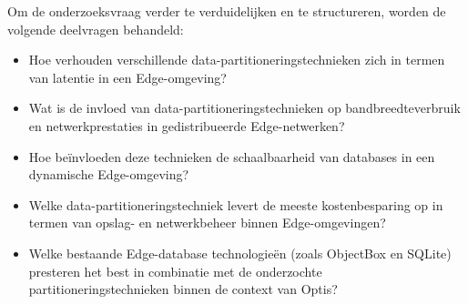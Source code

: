 Om de onderzoeksvraag verder te verduidelijken en te structureren, worden de volgende deelvragen behandeld:
\begin{itemize}
    \item Hoe verhouden verschillende data-partitioneringstechnieken zich in termen van latentie in een Edge-omgeving?
    \item Wat is de invloed van data-partitioneringstechnieken op bandbreedteverbruik en netwerkprestaties in gedistribueerde Edge-netwerken?
    \item Hoe beïnvloeden deze technieken de schaalbaarheid van databases in een dynamische Edge-omgeving?
    \item Welke data-partitioneringstechniek levert de meeste kostenbesparing op in termen van opslag- en netwerkbeheer binnen Edge-omgevingen?
    \item Welke bestaande Edge-database technologieën (zoals ObjectBox en SQLite) presteren het best in combinatie met de onderzochte partitioneringstechnieken binnen de context van Optis?
\end{itemize}
